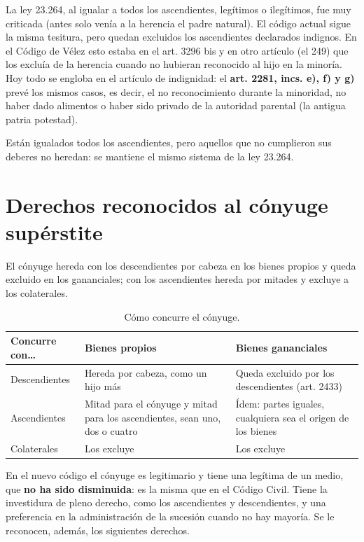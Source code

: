 \documentclass[12pt,oneside]{book}
\begin{document}
La ley 23.264, al igualar a todos los ascendientes, legítimos o ilegítimos, fue muy criticada (antes solo venía a la herencia el padre natural). El código actual sigue la misma tesitura, pero quedan excluidos los ascendientes declarados indignos. En el Código de Vélez esto estaba en el art. 3296 bis y en otro artículo (el 249) que los excluía de la herencia cuando no hubieran reconocido al hijo en la minoría. Hoy todo se engloba en el artículo de indignidad: el \textbf{art. 2281, incs. e), f) y g)} prevé los mismos casos, es decir, el no reconocimiento durante la minoridad, no haber dado alimentos o haber sido privado de la autoridad parental (la antigua patria potestad).

Están igualados todos los ascendientes, pero aquellos que no cumplieron sus deberes no heredan: se mantiene el mismo sistema de la ley 23.264.

\section{Derechos reconocidos al cónyuge supérstite}

El cónyuge hereda con los descendientes por cabeza en los bienes propios y queda excluido en los gananciales; con los ascendientes hereda por mitades y excluye a los colaterales.

\begin{table}[H]
\centering
\small
\begin{tabularx}{\textwidth}{
    >{\raggedright\arraybackslash}p{2.6cm}
    >{\raggedright\arraybackslash}X
    >{\raggedright\arraybackslash}X
}
\toprule
\textbf{Concurre con\ldots} & \textbf{Bienes propios} & \textbf{Bienes gananciales} \\
\midrule
Descendientes & Hereda por cabeza, como un hijo más & Queda excluido por los descendientes (art. 2433) \\
\addlinespace
Ascendientes & Mitad para el cónyuge y mitad para los ascendientes, sean uno, dos o cuatro & Ídem: partes iguales, cualquiera sea el origen de los bienes \\
\addlinespace
Colaterales & Los excluye & Los excluye \\
\bottomrule
\end{tabularx}
\caption*{Cómo concurre el cónyuge.}
\end{table}

En el nuevo código el cónyuge es legitimario y tiene una legítima de un medio, que \textbf{no ha sido disminuida}: es la misma que en el Código Civil. Tiene la investidura de pleno derecho, como los ascendientes y descendientes, y una preferencia en la administración de la sucesión cuando no hay mayoría. Se le reconocen, además, los siguientes derechos.
\end{document}
